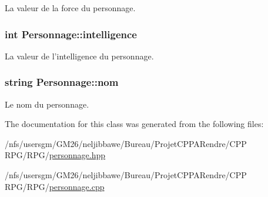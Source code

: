 La valeur de la force du personnage. 

\hypertarget{class_personnage_a8e9bc213349fb0553d76d4da6a711231}{
\subsubsection[{intelligence}]{\setlength{\rightskip}{0pt plus 5cm}int Personnage\-::intelligence\hspace{0.3cm}{\ttfamily [protected]}}}\label{class_personnage_a8e9bc213349fb0553d76d4da6a711231}


La valeur de l'intelligence du personnage. 

\hypertarget{class_personnage_acb7331b96dfc9f2aec78c60799030302}{
\subsubsection[{nom}]{\setlength{\rightskip}{0pt plus 5cm}string Personnage\-::nom\hspace{0.3cm}{\ttfamily [protected]}}}\label{class_personnage_acb7331b96dfc9f2aec78c60799030302}


Le nom du personnage. 



The documentation for this class was generated from the following files\-:\begin{DoxyCompactItemize}
\item 
/nfs/usersgm/\-G\-M26/neljibbawe/\-Bureau/\-Projet\-C\-P\-P\-A\-Rendre/\-C\-P\-P R\-P\-G/\-R\-P\-G/\hyperlink{personnage_8hpp}{personnage.\-hpp}\item 
/nfs/usersgm/\-G\-M26/neljibbawe/\-Bureau/\-Projet\-C\-P\-P\-A\-Rendre/\-C\-P\-P R\-P\-G/\-R\-P\-G/\hyperlink{personnage_8cpp}{personnage.\-cpp}\end{DoxyCompactItemize}
